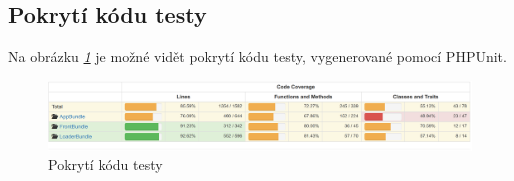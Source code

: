 \subsection{Pokrytí kódu testy}
Na obrázku \emph{\ref{phpunit-coverage}} je možné vidět pokrytí kódu testy, vygenerované pomocí PHPUnit.

\begin{figure}[htbp]
    \centering
    \includegraphics[width=\textwidth,height=\textheight,keepaspectratio]{images/coverage.png}
    \caption{Pokrytí kódu testy\label{phpunit-coverage}}
\end{figure}
